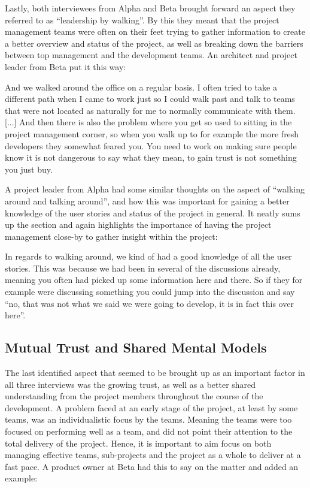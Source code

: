 Lastly, both interviewees from Alpha and Beta brought forward an aspect they referred to as ``leadership by walking''. By this they meant that the project management teams were often on their feet trying to gather information to create a better overview and status of the project, as well as breaking down the barriers between top management and the development teams. An architect and project leader from Beta put it this way:

\begin{fancyquotes}
And we walked around the office on a regular basis. I often tried to take a different path when I came to work just so I could walk past and talk to teams that were not located as naturally for me to normally communicate with them. [...] And then there is also the problem where you get so used to sitting in the project management corner, so when you walk up to for example the more fresh developers they somewhat feared you. You need to work on making sure people know it is not dangerous to say what they mean, to gain trust is not something you just buy.
\end{fancyquotes}

A project leader from Alpha had some similar thoughts on the aspect of ``walking around and talking around'', and how this was important for gaining a better knowledge of the user stories and status of the project in general. It neatly sums up the section and again highlights the importance of having the project management close-by to gather insight within the project:

\begin{fancyquotes}
In regards to walking around, we kind of had a good knowledge of all the user stories. This was because we had been in several of the discussions already, meaning you often had picked up some information here and there. So if they for example were discussing something you could jump into the discussion and say ``no, that was not what we said we were going to develop, it is in fact this over here''.
\end{fancyquotes}

\subsection{Mutual Trust and Shared Mental Models}

The last identified aspect that seemed to be brought up as an important factor in all three interviews was the growing trust, as well as a better shared understanding from the project members throughout the course of the development. A problem faced at an early stage of the project, at least by some teams, was an individualistic focus by the teams. Meaning the teams were too focused on performing well as a team, and did not point their attention to the total delivery of the project. Hence, it is important to aim focus on both managing effective teams, sub-projects and the project as a whole to deliver at a fast pace. A product owner at Beta had this to say on the matter and added an example:

